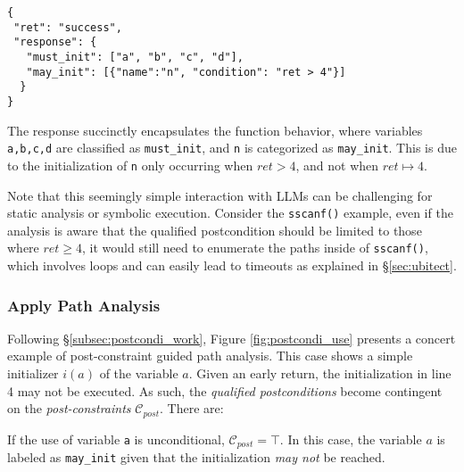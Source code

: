 \begin{lstlisting}[numbers=none]
{
 "ret": "success",
 "response": {
   "must_init": ["a", "b", "c", "d"],
   "may_init": [{"name":"n", "condition": "ret > 4"}]
  }
}
\end{lstlisting}


The response succinctly encapsulates the function behavior, where variables \texttt{a,b,c,d} are classified as \texttt{must\_init}, and \texttt{n} is categorized as \texttt{may\_init}. This is due to the initialization of \texttt{n} only occurring when \(ret > 4\), and not when \(ret \mapsto 4\).

Note that this seemingly simple interaction with LLMs can be challenging for static analysis or symbolic execution. Consider the \texttt{sscanf()} example, even if the analysis is aware that the qualified postcondition should be limited to those where \(ret \ge 4\),
it would still need to enumerate the paths inside of \texttt{sscanf()}, which involves loops and can easily lead to timeouts as explained in \S\ref{sec:ubitect}.



\subsubsection{Apply Path Analysis}
\label{subsubsec:postcon_rule}

Following \S\ref{subsec:postcondi_work}, Figure \ref{fig:postcondi_use} presents a concert example of post-constraint guided path analysis. This case shows a simple initializer \(i(a)\) of the variable \(a\). Given an early return, the initialization in line 4 may not be executed. As such, the \textit{qualified postconditions} become contingent on the \textit{post-constraints} \(\mathcal{C}_{post}\). There are:

\squishlist
\item If the use of variable \texttt{a} is unconditional, \ie \(\mathcal{C}_{post}=\top\).
In this case, the variable \(a\) is labeled as \texttt{may\_init} given that the initialization \textit{may not} be reached.

